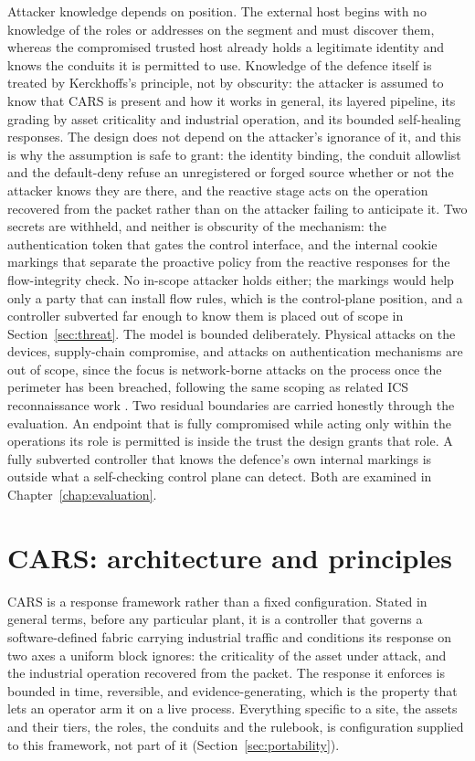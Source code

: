Attacker knowledge depends on position. The external host begins with no knowledge of the roles or addresses on the segment and must discover them, whereas the compromised trusted host already holds a legitimate identity and knows the conduits it is permitted to use. Knowledge of the defence itself is treated by Kerckhoffs's principle, not by obscurity: the attacker is assumed to know that CARS is present and how it works in general, its layered pipeline, its grading by asset criticality and industrial operation, and its bounded self-healing responses. The design does not depend on the attacker's ignorance of it, and this is why the assumption is safe to grant: the identity binding, the conduit allowlist and the default-deny refuse an unregistered or forged source whether or not the attacker knows they are there, and the reactive stage acts on the operation recovered from the packet rather than on the attacker failing to anticipate it. Two secrets are withheld, and neither is obscurity of the mechanism: the authentication token that gates the control interface, and the internal cookie markings that separate the proactive policy from the reactive responses for the flow-integrity check. No in-scope attacker holds either; the markings would help only a party that can install flow rules, which is the control-plane position, and a controller subverted far enough to know them is placed out of scope in Section~\ref{sec:threat}. The model is bounded deliberately. Physical attacks on the devices, supply-chain compromise, and attacks on authentication mechanisms are out of scope, since the focus is network-borne attacks on the process once the perimeter has been breached, following the same scoping as related ICS reconnaissance work \cite{samanis2025phd}. Two residual boundaries are carried honestly through the evaluation. An endpoint that is fully compromised while acting only within the operations its role is permitted is inside the trust the design grants that role. A fully subverted controller that knows the defence's own internal markings is outside what a self-checking control plane can detect. Both are examined in Chapter~\ref{chap:evaluation}.

\section{CARS: architecture and principles}
\label{sec:designoverview}

CARS is a response framework rather than a fixed configuration. Stated in general terms, before any particular plant, it is a controller that governs a software-defined fabric carrying industrial traffic and conditions its response on two axes a uniform block ignores: the criticality of the asset under attack, and the industrial operation recovered from the packet. The response it enforces is bounded in time, reversible, and evidence-generating, which is the property that lets an operator arm it on a live process. Everything specific to a site, the assets and their tiers, the roles, the conduits and the rulebook, is configuration supplied to this framework, not part of it (Section~\ref{sec:portability}).

